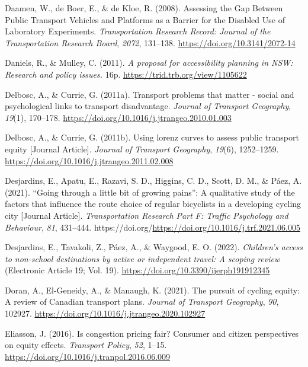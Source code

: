 \documentclass[
  letterpaper,
  DIV=11,
  numbers=noendperiod]{scrartcl}
\newlength{\cslhangindent}
\newenvironment{CSLReferences}[2] %
 {\begin{list}{}{%
  \setlength{\itemindent}{0pt}
  \setlength{\leftmargin}{0pt}
  \setlength{\parsep}{0pt}
  \ifodd #1
   \setlength{\leftmargin}{\cslhangindent}
   \setlength{\itemindent}{-1\cslhangindent}
  \fi
  \setlength{\itemsep}{#2\baselineskip}}}
 {\end{list}}
\begin{document}
\begin{CSLReferences}{1}{0}
Daamen, W., de Boer, E., \& de Kloe, R. (2008). Assessing the {Gap
Between Public Transport Vehicles} and {Platforms} as a {Barrier} for
the {Disabled Use} of {Laboratory Experiments}. \emph{Transportation
Research Record: Journal of the Transportation Research Board},
\emph{2072}, 131--138. \url{https://doi.org/10.3141/2072-14}

Daniels, R., \& Mulley, C. (2011). \emph{A proposal for accessibility
planning in {NSW}: Research and policy issues.} 16p.
\url{https://trid.trb.org/view/1105622}

Delbosc, A., \& Currie, G. (2011a). Transport problems that matter -
social and psychological links to transport disadvantage. \emph{Journal
of Transport Geography}, \emph{19}(1), 170--178.
\url{https://doi.org/10.1016/j.jtrangeo.2010.01.003}

Delbosc, A., \& Currie, G. (2011b). Using lorenz curves to assess public
transport equity {[}Journal Article{]}. \emph{Journal of Transport
Geography}, \emph{19}(6), 1252--1259.
\url{https://doi.org/10.1016/j.jtrangeo.2011.02.008}

Desjardins, E., Apatu, E., Razavi, S. D., Higgins, C. D., Scott, D. M.,
\& Páez, A. (2021). {``Going through a little bit of growing pains''}: A
qualitative study of the factors that influence the route choice of
regular bicyclists in a developing cycling city {[}Journal Article{]}.
\emph{Transportation Research Part F: Traffic Psychology and Behaviour},
\emph{81}, 431--444.
https://doi.org/\url{https://doi.org/10.1016/j.trf.2021.06.005}

Desjardins, E., Tavakoli, Z., Páez, A., \& Waygood, E. O. (2022).
\emph{Children's access to non-school destinations by active or
independent travel: A scoping review} (Electronic Article 19; Vol. 19).
\url{https://doi.org/10.3390/ijerph191912345}

Doran, A., El-Geneidy, A., \& Manaugh, K. (2021). The pursuit of cycling
equity: {A} review of {Canadian} transport plans. \emph{Journal of
Transport Geography}, \emph{90}, 102927.
\url{https://doi.org/10.1016/j.jtrangeo.2020.102927}

Eliasson, J. (2016). Is congestion pricing fair? Consumer and citizen
perspectives on equity effects. \emph{Transport Policy}, \emph{52},
1--15. \url{https://doi.org/10.1016/j.tranpol.2016.06.009}


\end{CSLReferences}
\end{document}
